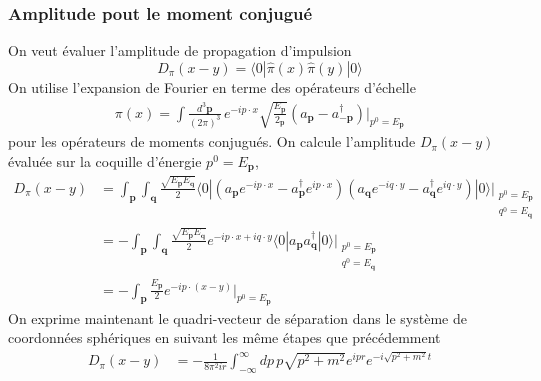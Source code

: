 \documentclass{article}
\numberwithin{equation}{section}
\begin{document}
\subsubsection{Amplitude pout le moment conjugué}
On veut évaluer l'amplitude de propagation d'impulsion
\begin{equation}
        D_{\pi}(x - y) = \langle 0 | \hat{\pi}(x) \hat{\pi}(y) | 0 \rangle 
\end{equation} 
On utilise l'expansion de Fourier en terme des opérateurs d'échelle
\begin{align}
        \pi(x) = \int \frac{d^{3}\mathbf{p}}{(2\pi)^{3}}\, e^{-i p \cdot x}\sqrt{\frac{E_{\mathbf{p}}}{2_{\mathbf{p}}}}(a_{\mathbf{p}} - a^{\dagger}_{-\mathbf{p}})\bigg|_{p^{0} = E_{\mathbf{p}}}
\end{align}
pour les opérateurs de moments conjugués. On calcule l'amplitude $D_{\pi}(x - y)$ évaluée sur la coquille d'énergie $p^{0} = E_{\mathbf{p}}$, 
\begin{align*}
D_\pi(x - y) &= \int_{\mathbf{p}} \int_{\mathbf{q}} \frac{\sqrt{E_{\mathbf{p}}E_{\mathbf{q}}}}{2}
        \langle 0 |  (a_{\mathbf{p}}e^{-i p\cdot x} - a^{\dagger}_{\mathbf{p}}e^{i p\cdot x})(a_{\mathbf{q}}e^{-i q \cdot y} - a^{\dagger}_{\mathbf{q}}e^{i q\cdot y})
        | 0 \rangle 
        \bigg|_{\substack{p^{0} = E_{\mathbf{p}} \\ q^{0} = E_{\mathbf{q}}}} \\
        &= -\int_{\mathbf{p}} \int_{\mathbf{q}} \frac{\sqrt{E_{\mathbf{p}}E_{\mathbf{q}}}}{2}
        e^{-i p \cdot x + i q\cdot y}
        \langle 0 | a_{\mathbf{p}}a^{\dagger}_{\mathbf{q}} | 0 \rangle 
        \bigg|_{\substack{p^{0} = E_{\mathbf{p}} \\ q^{0} = E_{\mathbf{q}}}} \\
        &= -\int_{\mathbf{p}}  \frac{E_{\mathbf{p}}}{2}
        e^{-i p \cdot (x - y)}\bigg|_{p^{0} = E_{\mathbf{p}}} 
\end{align*}
On exprime maintenant le quadri-vecteur de séparation dans le système de coordonnées sphériques en suivant les même étapes que précédemment
\begin{align*}
        D_{\pi}(x - y) &=  -\frac{1}{8\pi^2ir}  \int_{-\infty }^{\infty }dp\, p \sqrt{p^2 + m^2}e^{ipr} e^{-i\sqrt{p^2 + m^2}t} 
\end{align*}
\end{document}
